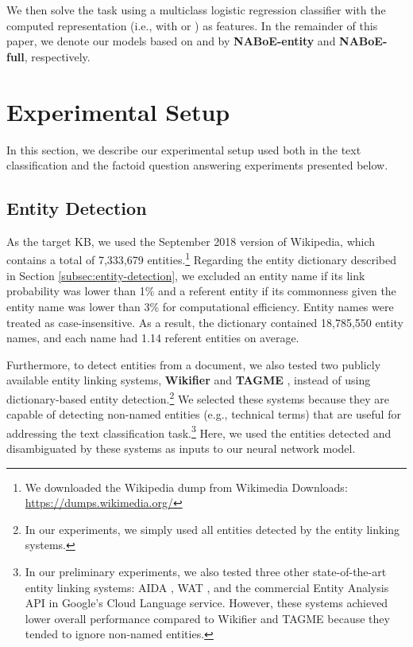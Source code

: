 \documentclass[11pt,a4paper]{article}
\begin{document}
    We then solve the task using a multiclass logistic regression classifier with the computed representation (i.e., with  or ) as features.
    In the remainder of this paper, we denote our models based on  and  by \textbf{NABoE-entity} and \textbf{NABoE-full}, respectively.

    \section{Experimental Setup}

    In this section, we describe our experimental setup used both in the text classification and the factoid question answering experiments presented below.

    \subsection{Entity Detection}
    \label{subsec:kb-and-entity-dictionary}

    As the target KB, we used the September 2018 version of Wikipedia, which contains a total of 7,333,679 entities.\footnote{We downloaded the Wikipedia dump from Wikimedia Downloads: \url{https://dumps.wikimedia.org/}}
    Regarding the entity dictionary described in Section \ref{subsec:entity-detection}, we excluded an entity name if its link probability was lower than 1\% and a referent entity if its commonness given the entity name was lower than 3\% for computational efficiency.
    Entity names were treated as case-insensitive.
    As a result, the dictionary contained 18,785,550 entity names, and each name had 1.14 referent entities on average.

    Furthermore, to detect entities from a document, we also tested two publicly available entity linking systems, \textbf{Wikifier} \cite{Ratinov2011,cheng-roth:2013:EMNLP} and \textbf{TAGME} \cite{Ferragina2012}, instead of using dictionary-based entity detection.\footnote{In our experiments, we simply used all entities detected by the entity linking systems.}
    We selected these systems because they are capable of detecting non-named entities (e.g., technical terms) that are useful for addressing the text classification task.\footnote{In our preliminary experiments, we also tested three other state-of-the-art entity linking systems: AIDA \cite{Hoffart2011}, WAT \cite{Piccinno:2014:TWN:2633211.2634350}, and the commercial Entity Analysis API in Google's Cloud Language service.
        However, these systems achieved lower overall performance compared to Wikifier and TAGME because they tended to ignore non-named entities.
    }
    Here, we used the entities detected and disambiguated by these systems as inputs to our neural network model.
\end{document}
